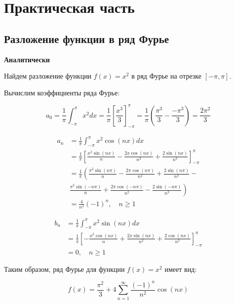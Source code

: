 \section{Практическая часть}
\subsection{Разложение функции в ряд Фурье}{
  \textbf{Аналитически}

  Найдем разложение функции $f(x)=x^2$ в ряд Фурье на отрезке $[-\pi,\pi]$.
  
  Вычислим коэффициенты ряда Фурье:

  \begin{equation}
    a_0 = \frac{1}{\pi}\int_{-\pi}^{\pi} x^2 dx = \frac{1}{\pi}\left[\frac{x^3}{3}\right]_{-\pi}^{\pi} = \frac{1}{\pi}\left(\frac{\pi^3}{3} - \frac{-\pi^3}{3}\right) = \frac{2\pi^2}{3}
  \end{equation}


  \begin{equation}
    \begin{split}
    a_n & = \frac{1}{\pi}\int_{-\pi}^{\pi} x^2 \cos(nx) dx \\
    & = \frac{1}{\pi}\left[\frac{x^2\sin(nx)}{n} - \frac{2x\cos(nx)}{n^2} + \frac{2\sin(nx)}{n^3}\right]_{-\pi}^{\pi} \\
    & = \frac{1}{\pi}\left(\frac{\pi^2\sin(n\pi)}{n} - \frac{2\pi\cos(n\pi)}{n^2} + \frac{2\sin(n\pi)}{n^3} - \right. \\
    & \left. \frac{\pi^2\sin(-n\pi)}{n} + \frac{2\pi\cos(-n\pi)}{n^2} - \frac{2\sin(-n\pi)}{n^3}\right) \\
    & = \frac{4}{n^2}(-1)^n, \quad n \geq 1
    \end{split}
  \end{equation}

  \begin{equation}
    \begin{split}
    b_n & = \frac{1}{\pi}\int_{-\pi}^{\pi} x^2 \sin(nx) dx \\
    & = \frac{1}{\pi}\left[-\frac{x^2\cos(nx)}{n} + \frac{2x\sin(nx)}{n^2} + \frac{2\cos(nx)}{n^3}\right]_{-\pi}^{\pi} \\
    & = 0, \quad n \geq 1
    \end{split}
  \end{equation}

  Таким образом, ряд Фурье для функции $f(x)=x^2$ имеет вид:

  \begin{equation}
    f(x) = \frac{\pi^2}{3} + 4\sum_{n=1}^{\infty} \frac{(-1)^n}{n^2}\cos(nx)
  \end{equation}

}
